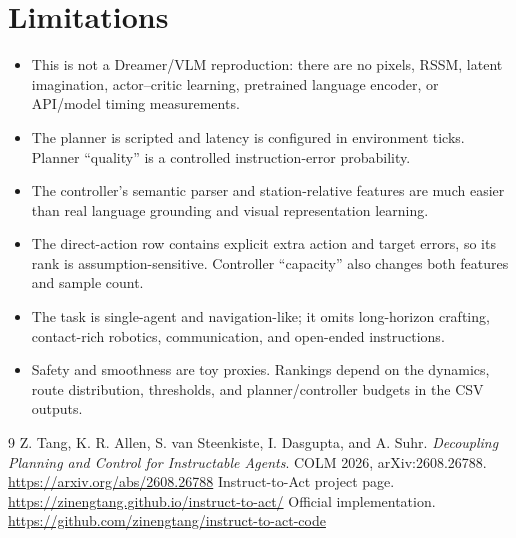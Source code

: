 \documentclass[11pt]{article}
\begin{document}
\section{Limitations}
\begin{itemize}[leftmargin=1.5em]
\item This is not a Dreamer/VLM reproduction: there are no pixels, RSSM, latent imagination, actor--critic learning, pretrained language encoder, or API/model timing measurements.
\item The planner is scripted and latency is configured in environment ticks. Planner ``quality'' is a controlled instruction-error probability.
\item The controller's semantic parser and station-relative features are much easier than real language grounding and visual representation learning.
\item The direct-action row contains explicit extra action and target errors, so its rank is assumption-sensitive. Controller ``capacity'' also changes both features and sample count.
\item The task is single-agent and navigation-like; it omits long-horizon crafting, contact-rich robotics, communication, and open-ended instructions.
\item Safety and smoothness are toy proxies. Rankings depend on the dynamics, route distribution, thresholds, and planner/controller budgets in the CSV outputs.
\end{itemize}

\begin{thebibliography}{9}
 Z. Tang, K. R. Allen, S. van Steenkiste, I. Dasgupta, and A. Suhr. \emph{Decoupling Planning and Control for Instructable Agents}. COLM 2026, arXiv:2608.26788. \url{https://arxiv.org/abs/2608.26788}
 Instruct-to-Act project page. \url{https://zinengtang.github.io/instruct-to-act/}
 Official implementation. \url{https://github.com/zinengtang/instruct-to-act-code}
\end{thebibliography}
\end{document}
